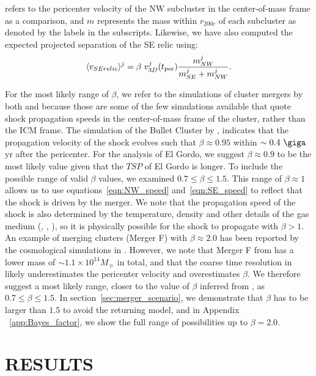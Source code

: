 \documentclass[letterpaper,useAMS,usenatbib]{mn2e}
\begin{document}
refers to the pericenter velocity of
the NW subcluster in the center-of-mass frame as a comparison, and $m$
represents the mass within $r_{200c}$ of each subcluster as denoted by the
labels in the subscripts. 
Likewise, we have also computed the expected projected separation of the SE
relic using:  
\begin{equation}
	\label{eqn:SE_speed}
	\langle v_{SE relic} \rangle^j = \beta~v^j_{3D}(t_{\rm per}) \frac{m^j_{NW}}{m^j_{SE} + m^j_{NW}}. 
\end{equation}
\par 
For the most likely range of $\beta$, we refer to the
simulations of cluster mergers by both \cite{Springel2007} and
\cite{Paul2011b} because those are some of the few simulations available that
quote shock propagation speeds in the center-of-mass frame of the cluster,
rather than the ICM frame. 
The simulation of the Bullet Cluster by \cite{Springel2007}, 
indicates that the propagation velocity of the shock evolves such that $\beta \approx 0.95$ within
$\sim 0.4~\giga$yr after the pericenter. For the analysis of El Gordo,
we suggest $\beta \approx 0.9$ to be the most likely value given that the $TSP$ of
El Gordo is longer. 
To include the possible range of valid $\beta$ values,
we examined $0.7 \leq \beta \leq 1.5$. This range of $\beta \approx 1$ allows us to use  
equations~\ref{eqn:NW_speed} and~\ref{eqn:SE_speed} to reflect that the
shock is driven by the merger. We note that the propagation speed of the
shock is also determined by the temperature, density and other details of
the gas medium (\citealt{Prokhorov2007}, \citealt{Springel2007},
\citealt{Milosavljevic07}), so it is physically possible for the shock to
propagate with $\beta > 1$. An example of
merging clusters (Merger F) with $\beta \approx 2.0$ has been reported by the cosmological
simulations in \citealt{Paul2011b}. 
However, we note that Merger F from \citealt{Paul2011b} has a lower mass of
$\sim 1.1 \times 10^{14} M_{\sun}$ in total, and that the coarse time resolution
in \citealt{Paul2011b} likely underestimates the
pericenter velocity and overestimates $\beta$.
We therefore
suggest a most likely range, closer to the value of $\beta$ inferred from
\cite{Springel2007}, as $0.7 \leq \beta \leq 1.5$.
In section~\ref{sec:merger_scenario}, we demonstrate that $\beta$ has to be
larger than $1.5$ to 
avoid the returning model, and in Appendix
~\ref{app:Bayes_factor}, we show the full range of possibilities up to
$\beta = 2.0$. 
\label{sec:positionprior}

\section{RESULTS} 
\end{document}
